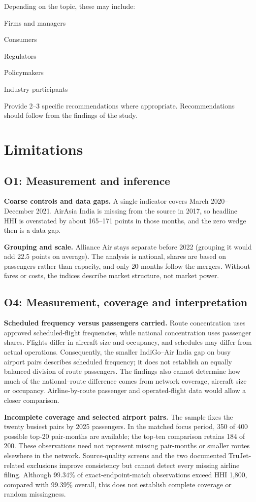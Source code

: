\documentclass[12pt,a4paper]{article}
\newcommand{\templatebullet}[1]{\par\noindent\textbullet\hspace{5.88pt}#1\par}
\newif\ifoneon
\newcommand{\oneHL}{\par\oneontrue\color{orange}\captionsetup{font+={color=blue}}}
\begin{document}
Depending on the topic, these may include:
\templatebullet{Firms and managers}
\templatebullet{Consumers}
\templatebullet{Regulators}
\templatebullet{Policymakers}
\templatebullet{Industry participants}
Provide 2--3 specific recommendations where appropriate. Recommendations should follow from the findings of the study.

\clearpage
\section{Limitations}
{\oneHL \subsection{O1: Measurement and inference}
\textbf{Coarse controls and data gaps.} A single indicator covers March 2020--December 2021. AirAsia India is missing from the source in 2017, so headline HHI is overstated by about 165--171 points in those months, and the zero wedge then is a data gap.

\textbf{Grouping and scale.} Alliance Air stays separate before 2022 (grouping it would add 22.5 points on average). The analysis is national, shares are based on passengers rather than capacity, and only 20 months follow the mergers. Without fares or costs, the indices describe market structure, not market power.
\par}

\clearpage
\subsection{O4: Measurement, coverage and interpretation}
\textbf{Scheduled frequency versus passengers carried.} Route concentration uses approved scheduled-flight frequencies, while national concentration uses passenger shares. Flights differ in aircraft size and occupancy, and schedules may differ from actual operations. Consequently, the smaller IndiGo--Air India gap on busy airport pairs describes scheduled frequency; it does not establish an equally balanced division of route passengers. The findings also cannot determine how much of the national--route difference comes from network coverage, aircraft size or occupancy. Airline-by-route passenger and operated-flight data would allow a closer comparison.

\textbf{Incomplete coverage and selected airport pairs.} The sample fixes the twenty busiest pairs by 2025 passengers. In the matched focus period, 350 of 400 possible top-20 pair-months are available; the top-ten comparison retains 184 of 200. These observations need not represent missing pair-months or smaller routes elsewhere in the network. Source-quality screens and the two documented TruJet-related exclusions improve consistency but cannot detect every missing airline filing. Although 99.34\% of exact-endpoint-match observations exceed HHI 1,800, compared with 99.39\% overall, this does not establish complete coverage or random missingness.
\end{document}
